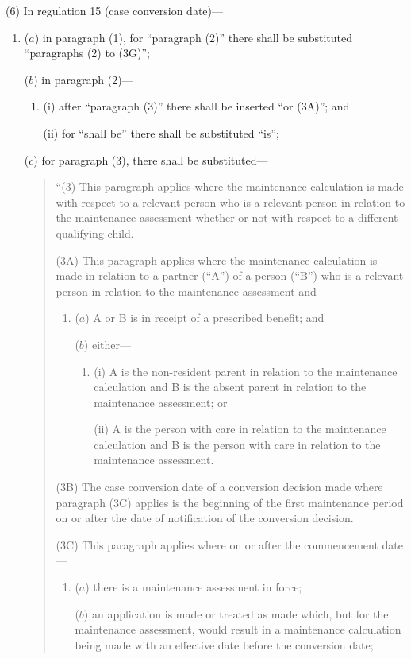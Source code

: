 \documentclass[12pt,a4paper]{article}
\begin{document}
(6) In regulation 15 (case conversion date)—
\begin{enumerate}\item[]
($a$) in paragraph (1), for “paragraph (2)” there shall be substituted “paragraphs (2) to (3G)”;

($b$) in paragraph (2)—
\begin{enumerate}\item[]
(i) after “paragraph (3)” there shall be inserted “or (3A)”; and

(ii) for “shall be” there shall be substituted “is”;
\end{enumerate}

($c$) for paragraph (3), there shall be substituted—
\begin{quotation}
“(3) This paragraph applies where the maintenance calculation is made with respect to a relevant person who is a relevant person in relation to the maintenance assessment whether or not with respect to a different qualifying child.

(3A) This paragraph applies where the maintenance calculation is made in relation to a partner (“A”) of a person (“B”) who is a relevant person in relation to the maintenance assessment and—
\begin{enumerate}\item[]
($a$) A or B is in receipt of a prescribed benefit; and

($b$) either—
\begin{enumerate}\item[]
(i) A is the non-resident parent in relation to the maintenance calculation and B is the absent parent in relation to the maintenance assessment; or

(ii) A is the person with care in relation to the maintenance calculation and B is the person with care in relation to the maintenance assessment.
\end{enumerate}
\end{enumerate}

(3B) The case conversion date of a conversion decision made where paragraph (3C) applies is the beginning of the first maintenance period on or after the date of notification of the conversion decision.

(3C) This paragraph applies where on or after the commencement date—
\begin{enumerate}\item[]
($a$) there is a maintenance assessment in force;

($b$) an application is made or treated as made which, but for the maintenance assessment, would result in a maintenance calculation being made with an effective date before the conversion date;


\end{enumerate}
\end{quotation}
\end{enumerate}
\end{document}
